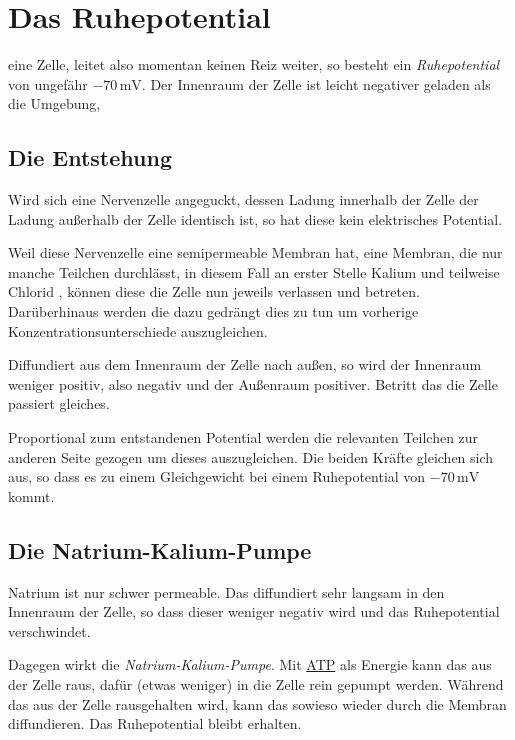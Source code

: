 \documentclass{article}
\begin{document}
\section{Das Ruhepotential}
 eine Zelle, leitet also momentan keinen Reiz weiter, so besteht ein \emph{Ruhepotential} von ungefähr $-70\,\text{mV}$. Der Innenraum der Zelle ist leicht negativer geladen als die Umgebung,
 
\subsection{Die Entstehung} 
Wird sich eine Nervenzelle angeguckt, dessen Ladung innerhalb der Zelle der Ladung außerhalb der Zelle identisch ist, so hat diese kein elektrisches Potential.
 
Weil diese Nervenzelle eine semipermeable Membran hat, eine Membran, die nur manche Teilchen durchlässt, in diesem Fall an erster Stelle Kalium  und teilweise Chlorid , können diese die Zelle nun jeweils verlassen und betreten. Darüberhinaus werden die dazu gedrängt dies zu tun um vorherige Konzentrationsunterschiede auszugleichen.
 
Diffundiert  aus dem Innenraum der Zelle nach außen, so wird der Innenraum weniger positiv, also negativ und der Außenraum positiver. Betritt das  die Zelle passiert gleiches.
 
Proportional zum entstandenen Potential werden die relevanten Teilchen zur anderen Seite gezogen um dieses auszugleichen. Die beiden Kräfte gleichen sich aus, so dass es zu einem Gleichgewicht bei einem Ruhepotential von $-70\,\text{mV}$ kommt. 
 
\subsection{Die Natrium-Kalium-Pumpe} 
Natrium  ist nur schwer permeable. Das  diffundiert sehr langsam in den Innenraum der Zelle, so dass dieser weniger negativ wird und das Ruhepotential verschwindet.
 
Dagegen wirkt die \emph{Natrium-Kalium-Pumpe}. Mit \hyperref[APT]{ATP} als Energie kann das  aus der Zelle raus, dafür (etwas weniger)  in die Zelle rein gepumpt werden. Während das  aus der Zelle rausgehalten wird, kann das  sowieso wieder durch die Membran diffundieren. Das Ruhepotential bleibt erhalten.
 
\end{document}
